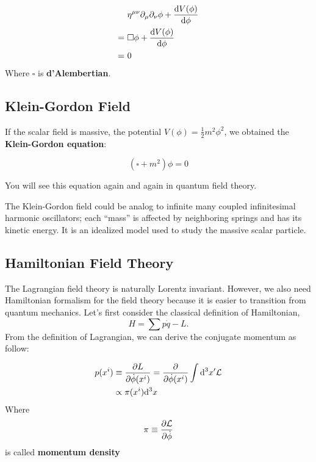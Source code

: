 \documentclass[../QFTCS_note.tex]{subfiles}
\numberwithin{equation}{subsection}
\begin{document}
\begin{align}                                            & \eta^{\mu\nu}\partial_{\mu}\partial_{\nu}\phi+\frac{\mathrm{d}V(\phi)}{\mathrm{d}\phi} \\
                                                     =\  & \square\phi+\frac{\mathrm{d}V(\phi)}{\mathrm{d}\phi}                       \\
                                                     =\  & 0
\end{align}
Where \(\square\) is \textbf{d'Alembertian}.

\subsection{Klein-Gordon Field}
If the scalar field is massive, the potential \(V(\phi)=\frac{1}{2}m^2\phi^2\),
we obtained the \textbf{Klein-Gordon equation}:
\begin{definition}
  \[(\square +m^2)\phi = 0\]
\end{definition}
You will see this equation again and again in quantum field theory.
\begin{remark}
  The Klein-Gordon field could be analog to infinite many coupled infinitesimal harmonic oscillators;
  each ``mass'' is affected by neighboring springs and has its kinetic energy.
  It is an idealized model used to study the massive scalar particle.
\end{remark}



\subsection{Hamiltonian Field Theory}
The Lagrangian field theory is naturally Lorentz invariant. However, we also need Hamiltonian formalism for the field theory
because it is easier to transition from quantum mechanics.
Let's first consider the classical definition of Hamiltonian, \[H=\sum p\dot{q}-L.\]
From the definition of Lagrangian, we can derive the conjugate momentum as follow:

\begin{align}
  p(x^i)\equiv & \;\frac{\partial L}{\partial \dot{\phi}(x^i)}
  =\frac{\partial}{\partial \dot{\phi}(x^i)}\int \mathrm{d}^3x' \mathcal{L} \\
  \propto      & \;\pi(x^i) \mathrm{d}^3x
\end{align}
\bigskip
Where \[\pi \equiv \frac{\partial \mathcal{L}}{\partial \dot{\phi}}\]
is called \textbf{momentum density}
\end{document}
